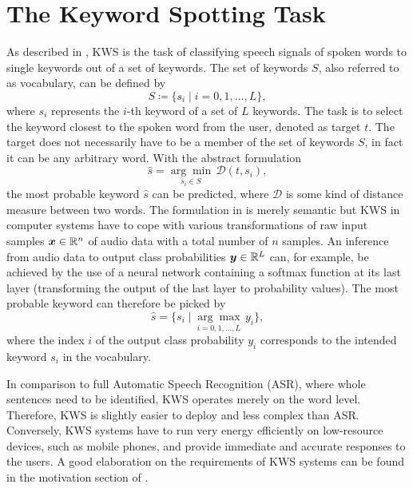 
\section{The Keyword Spotting Task}\label{sec:intro_kws}
As described in , KWS is the task of classifying speech signals of spoken words to single keywords out of a set of keywords.
The set of keywords $S$, also referred to as vocabulary, can be defined by
\begin{equation}\label{eq:intro_kws_dict}
	S \coloneqq \{s_i \mid i = 0, 1, \dots, L\},
\end{equation}
where $s_i$ represents the $i$-th keyword of a set of $L$ keywords.
The task is to select the keyword closest to the spoken word from the user, denoted as target $t$.
The target does not necessarily have to be a member of the set of keywords $S$, in fact it can be any arbitrary word.
With the abstract formulation
\begin{equation}\label{eq:intro_kws_task}
	\hat{s} = \underset{s_i \in S}{\arg \min} \, \mathcal{D}(t, s_i),
\end{equation}
the most probable keyword $\hat{s}$ can be predicted, where $\mathcal{D}$ is some kind of distance measure between two words.
The formulation in  is merely semantic but KWS in computer systems have to cope with various transformations of raw input samples $\bm{x} \in \mathbb{R}^n$ of audio data with a total number of $n$ samples.
An inference from audio data to output class probabilities $\bm{y} \in \mathbb{R}^L$ can, for example, be achieved by the use of a neural network containing a softmax function at its last layer (transforming the output of the last layer to probability values).
The most probable keyword can therefore be picked by
\begin{equation}\label{eq:intro_kws_class}
	\hat{s} = \{s_i \mid \underset{i = 0, 1, \dots, L}{\arg \max} \, y_i\},
\end{equation}
where the index $i$ of the output class probability $y_i$ corresponds to the intended keyword $s_i$ in the vocabulary.

In comparison to full Automatic Speech Recognition (ASR), where whole sentences need to be identified, KWS operates merely on the word level.
Therefore, KWS is slightly easier to deploy and less complex than ASR.
Conversely, KWS systems have to run very energy efficiently on low-resource devices, such as mobile phones, and provide immediate and accurate responses to the users.
A good elaboration on the requirements of KWS systems can be found in the motivation section of \cite{Warden2018}.